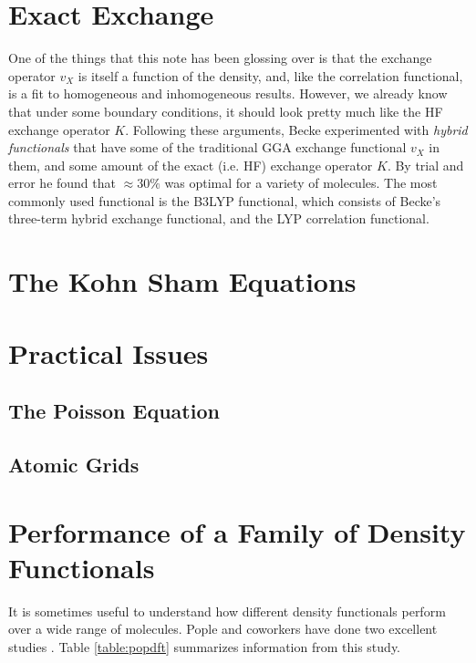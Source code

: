 \section{Exact Exchange}
One of the things that this note has been glossing over is that the
exchange operator $v_X$ is itself a function of the density, and, like
the correlation functional, is a fit to homogeneous and inhomogeneous
results. However, we already know that under some boundary conditions,
it should look pretty much like the HF exchange operator
$K$. Following these arguments, Becke experimented with
\emph{hybrid functionals} that have some of the traditional GGA
exchange functional $v_X$ in them, and some amount of the exact
(i.e. HF) exchange operator $K$. By trial and error he found that
$\approx30\%$ was optimal for a variety of molecules. The most
commonly used functional is the B3LYP functional, which consists of
Becke's three-term hybrid exchange functional, and the LYP correlation
functional. 

\section{The Kohn Sham Equations}

\section{Practical Issues}

\subsection{The Poisson Equation}

\subsection{Atomic Grids}

\section{Performance of a Family of Density Functionals}
It is sometimes useful to understand how different density functionals
perform over a wide range of molecules. Pople and coworkers have done
two excellent studies \cite{Johnson93,Curtiss96}. Table
\ref{table:popdft} summarizes information from this study.

